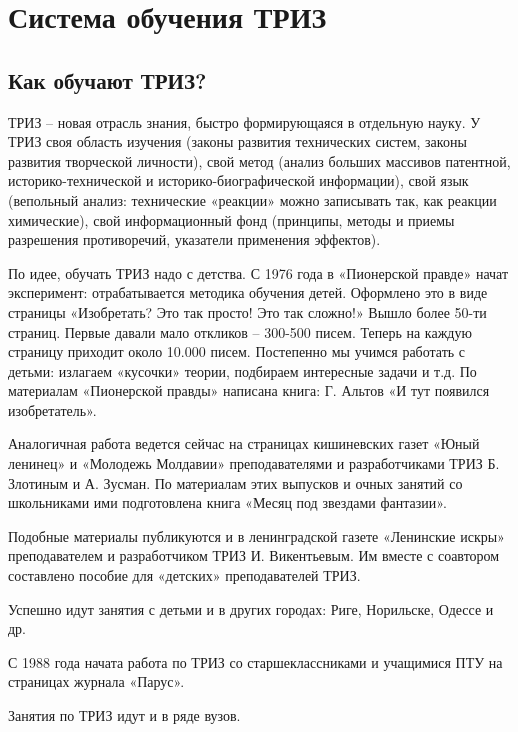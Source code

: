 \documentclass[11pt,a4paper]{article}
\begin{document}
\section{Система обучения ТРИЗ}

\subsection{Как обучают ТРИЗ?}

ТРИЗ -- новая отрасль знания, быстро формирующаяся в отдельную науку. У ТРИЗ
своя область изучения (законы развития технических систем, законы развития
творческой личности), свой метод (анализ больших массивов патентной,
историко-технической и историко-биографической информации), свой язык
(вепольный анализ: технические «реакции» можно записывать так, как реакции
химические), свой информационный фонд (принципы, методы и приемы разрешения
противоречий, указатели применения эффектов).

По идее, обучать ТРИЗ надо с детства. С 1976 года в «Пионерской правде» начат
эксперимент: отрабатывается методика обучения детей. Оформлено это в виде
страницы «Изобретать? Это так просто! Это так сложно!» Вышло более 50-ти
страниц. Первые давали мало откликов -- 300-500 писем. Теперь на каждую
страницу приходит около 10.000 писем. Постепенно мы учимся работать с детьми:
излагаем «кусочки» теории, подбираем интересные задачи и т.д. По материалам
«Пионерской правды» написана книга: Г. Альтов «И тут появился изобретатель».

Аналогичная работа ведется сейчас на страницах кишиневских газет «Юный
ленинец» и «Молодежь Молдавии» преподавателями и разработчиками ТРИЗ
Б. Злотиным и А. Зусман. По материалам этих выпусков и очных занятий со
школьниками ими подготовлена книга «Месяц под звездами фантазии».

Подобные материалы публикуются и в ленинградской газете «Ленинские искры»
преподавателем и разработчиком ТРИЗ И. Викентьевым. Им вместе с соавтором
составлено пособие для «детских» преподавателей ТРИЗ.

Успешно идут занятия с детьми и в других городах: Риге, Норильске, Одессе и
др.

С 1988 года начата работа по ТРИЗ со старшеклассниками и учащимися ПТУ на
страницах журнала «Парус».

Занятия по ТРИЗ идут и в ряде вузов.
\end{document}

